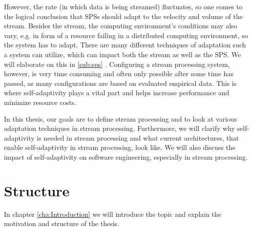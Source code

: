 \quad However, the rate (in which data is being streamed) fluctuates, so one comes to the logical conclusion that SPSs should adapt to the velocity and volume of the stream.
Besides the stream, the computing environment's conditions may also vary, e.g. in form of a resource failing in a distributed computing environment, 
so the system has to adapt. There are many different techniques of adaptation such a system can utilize, 
which can impact both the stream as well as the SPS. We will elaborate on this in \ref{sub:sps} .
Configuring a stream processing system, however, is very time consuming and often only possible after some time has passed, as many configurations are based on evaluated 
empirical data. This is where self-adaptivity plays a vital part and helps increase performance and minimize resource costs.

\quad In this thesis, our goals are to define stream processing and to look at various adaptation techniques in stream processing. Furthermore, we will clarify why
self-adaptivity is needed in stream processing and what current architectures, that enable self-adaptivity in stream processing, look like.
We will also discuss the impact of self-adaptivity on software engineering, especially in stream processing.


\section{Structure}
\label{sec:structure}

In chapter \ref{cha:Introduction} we will introduce the topic and explain the motivation and structure of the thesis.


